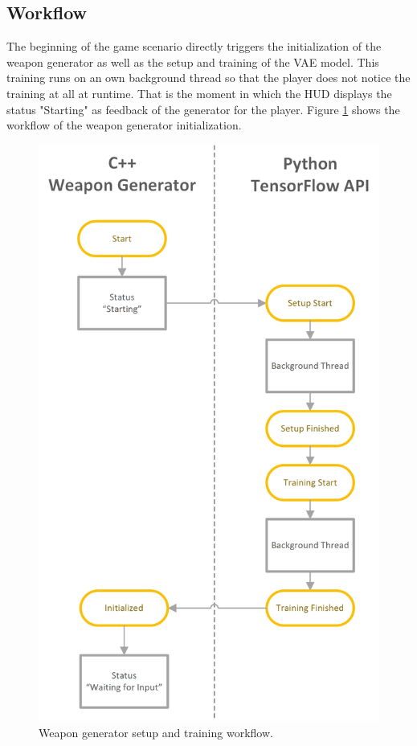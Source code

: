 \documentclass[MGS,Master,english]{twbook}%
\begin{document}
\subsection{Workflow}
The beginning of the game scenario directly triggers the initialization of the weapon generator as well as the setup and training of the \ac{VAE} model. This training runs on an own background thread so that the player does not notice the training at all at runtime. That is the moment in which the \ac{HUD} displays the status "Starting" as feedback of the generator for the player. Figure \ref{figure::weaponGen::init} shows the workflow of the weapon generator initialization.
\begin{figure}[!ht]
	\centering
	\includegraphics[width=0.5\linewidth]{PICs/WeaponGeneratorWorkflow_Setup_Training}
	\caption{Weapon generator setup and training workflow.} \label{figure::weaponGen::init}
\end{figure}
\end{document}
